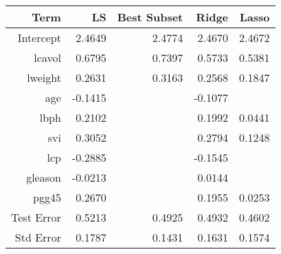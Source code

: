 \documentclass{letter}
\begin{document}
\begin{tabular}{rrrrr}  
	\hline
	Term& LS& Best Subset&Ridge & Lasso\\
	\hline
	Intercept & 2.4649 &2.4774 & 2.4670 &2.4672 \\
	lcavol & 0.6795 &0.7397 & 0.5733 &  0.5381\\
	lweight & 0.2631 &0.3163 & 0.2568 &  0.1847 \\
	age & -0.1415 &   & -0.1077&  \\
	lbph & 0.2102 & & 0.1992 &  0.0441\\
	svi & 0.3052 & & 0.2794 & 0.1248\\
	lcp & -0.2885 & &  -0.1545 &  \\
	gleason & -0.0213 & & 0.0144 &  \\
	pgg45 & 0.2670 & & 0.1955 & 0.0253 \\
	\hline
	Test Error & 0.5213 &0.4925 & 0.4932 & 0.4602\\
	Std Error & 0.1787 & 0.1431& 0.1631 & 0.1574 \\
	\hline
\end{tabular}
\end{document}
